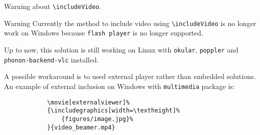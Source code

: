 	\begin{frame}[fragile]{Warning about \texttt{\textbackslash includeVideo}.}
		\begin{alertblock}{Warning}
			Currently the method to include video using \texttt{\textbackslash includeVideo} is no longer work on Windows because \texttt{flash player} is no longer supported.
		\end{alertblock}
		Up to now, this solution is still working on Linux with \texttt{okular}, \texttt{poppler} and \texttt{phonon-backend-vlc} installed.

		A possible workaround is to used external player rather than embedded solutions.
		An example of external inclusion on Windows with \texttt{multimedia} package is:
		\begin{verbatim}
			\movie[externalviewer]%
			{\includegraphics[width=\textheight]%
				{figures/image.jpg}%
			}{video_beamer.mp4}
		\end{verbatim}
	\end{frame}


